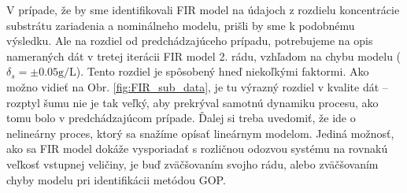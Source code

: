 V prípade, že by sme identifikovali FIR model na údajoch z rozdielu koncentrácie substrátu zariadenia a nominálneho modelu, prišli by sme k podobnému výsledku. Ale na rozdiel od predchádzajúceho prípadu, potrebujeme na opis nameraných dát v tretej iterácii FIR model 2. rádu, vzhľadom na chybu modelu ($ \delta_{s}=\pm0.05\si{\gram\per\liter} $). Tento rozdiel je spôsobený hneď niekoľkými faktormi. Ako možno vidieť na Obr. \ref{fig:FIR_sub_data}, je tu výrazný rozdiel v kvalite dát -- rozptyl šumu nie je tak veľký, aby prekrýval samotnú dynamiku procesu, ako tomu bolo v predchádzajúcom prípade. Ďalej si treba uvedomiť, že ide o nelineárny proces, ktorý sa snažíme opísať lineárnym modelom. Jediná možnosť, ako sa FIR model dokáže vysporiadať s rozličnou odozvou systému na rovnakú veľkosť vstupnej veličiny, je buď zväčšovaním svojho rádu, alebo zväčšovaním chyby modelu pri identifikácii metódou GOP. 
